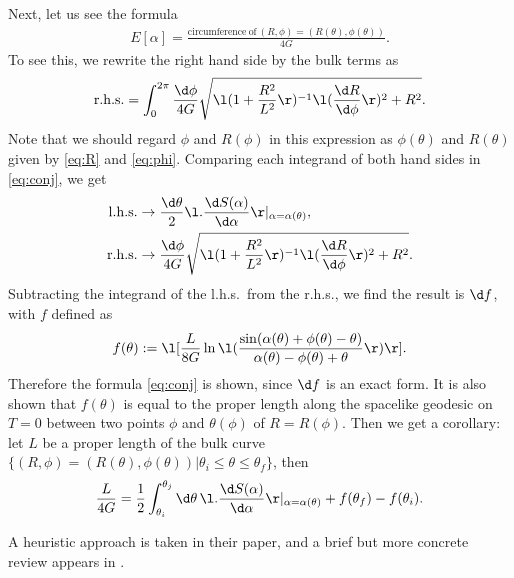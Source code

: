 \documentclass[12pt]{article}
\begin{document}
Next, let us see the formula
\begin{align}
	E[\alpha] = \frac{\mathrm{circumference~of~}(R,\phi) = (R(\theta),\phi(\theta))}{4G}.\label{eq:conj}
\end{align}
To see this, we rewrite the right hand side by the bulk terms as
\begin{align}
	\mathrm{r.h.s.} = \int_0^{2\pi} \frac{\d\phi}{4G}\sqrt{\l(1 + \frac{R^2}{L^2}\r)^{-1}\l(\frac{\d R}{\d \phi}\r)^2 + R^2}.
\end{align}
Note that we should regard $\phi$ and $R(\phi)$ in this expression as $\phi(\theta)$ and $R(\theta)$ given by \eqref{eq:R} 
and \eqref{eq:phi}.
Comparing each integrand of both hand sides in \eqref{eq:conj}, we get
\begin{align}
	\mathrm{l.h.s.} &\rightarrow \frac{\d\theta}{2}\l.\frac{\d S(\alpha)}{\d\alpha}\r|_{\alpha = \alpha(\theta)},\\
	\mathrm{r.h.s.} &\rightarrow \frac{\d\phi}{4G}\sqrt{\l(1 + \frac{R^2}{L^2}\r)^{-1}\l(\frac{\d R}{\d \phi}\r)^2 + R^2}.
\end{align}
Subtracting the integrand of the l.h.s.\ from the r.h.s., we find the result is $\d f$, with $f$ defined as
\begin{align}
	f(\theta) := \l[\frac{L}{8G}\ln\l(\frac{\sin(\alpha(\theta)+\phi(\theta)-\theta)}{\alpha(\theta)-\phi(\theta) + \theta} \r) \r].
\end{align}
Therefore the formula \eqref{eq:conj} is shown, since $\d f$ is an exact form.
It is also shown that $f(\theta)$ is equal to the proper length along the spacelike geodesic on $T=0$ between two points $\phi$ and $\theta(\phi)$ of $R = R(\phi)$.
Then we get a corollary: let $L$ be a proper length of the bulk curve $\{(R,\phi) = (R(\theta),\phi(\theta))|\theta_i\le\theta\le \theta_f\}$, then
\begin{align}
	\frac{L}{4G} = \frac{1}{2}\int_{\theta_i}^{\theta_j}\d\theta\,\l.\frac{\d S(\alpha)}{\d \alpha}\r|_{\alpha = \alpha(\theta)}  + f(\theta_f) - f(\theta_i).
\end{align}

A heuristic approach is taken in their paper, and a brief but more concrete review appears in \cite{Czech:2014ppa}.


































 

\end{document}
